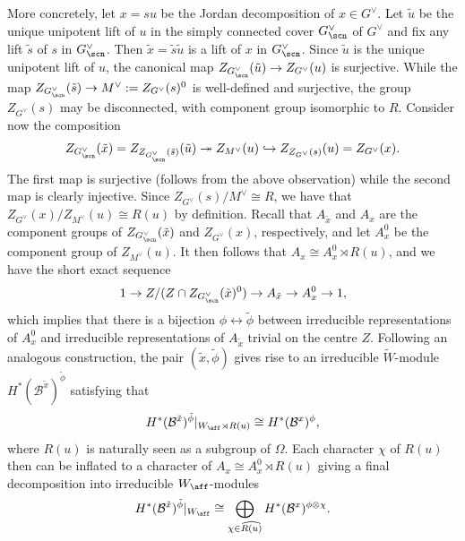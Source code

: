 More concretely, let $x=su$ be the Jordan decomposition of $x\in G^\vee$. Let $\tilde{u}$ be the unique unipotent lift of $u$ in the simply connected cover $G_{\scn}^\vee$ of $G^\vee$ and fix any lift $\tilde{s}$ of $s$ in $G_{\scn}^\vee$. Then $\tilde{x}=\tilde{s}\tilde{u}$ is a lift of $x$ in $G_{\scn}^\vee$. Since $\tilde{u}$ is the unique unipotent lift of $u$, the canonical map $Z_{G_{\scn}^\vee}(\tilde{u})\rightarrow Z_{G^\vee}(u)$ is surjective. While the map $Z_{G_{\scn}^\vee}(\tilde{s})\rightarrow M^\vee:=Z_{G^\vee}(s)^0$ is well-defined and surjective, the group $Z_{G^\vee}(s)$ may be disconnected, with component group isomorphic to $R$. Consider now the composition
$$Z_{G_{\scn}^\vee}(\tilde{x})=Z_{Z_{G_{\scn}^\vee}(\tilde{s})}(\tilde{u})\twoheadrightarrow Z_{M^\vee}(u)\hookrightarrow Z_{Z_{G^\vee}(s)}(u)=Z_{G^\vee}(x).$$
The first map is surjective (follows from the above observation) while the second map is clearly injective.
Since $Z_{G^\vee}(s)/M^\vee\cong R$, we have that $Z_{G^\vee}(x)/Z_{M^\vee}(u)\cong R(u)$ by definition. Recall that $A_{\tilde{x}}$ and $A_x$ are the component groups of $Z_{G_{\scn}^\vee}(\tilde{x})$ and $Z_{G^\vee}(x)$, respectively, and let $A_x^0$ be the component group of $Z_{M^\vee}(u)$. It then follows that $A_x\cong A_x^0\rtimes R(u)$, and we have the short exact sequence 
\begin{equation}
    1\rightarrow Z/(Z\cap Z_{G_{\scn}^\vee}(\tilde{x})^0)\rightarrow A_{\tilde{x}}\rightarrow A_x^0\rightarrow 1,
\end{equation}
which implies that there is a bijection $\phi\leftrightarrow\tilde{\phi}$ between irreducible representations of $A_x^0$ and irreducible representations of $A_{\tilde{x}}$ trivial on the centre $Z$. Following an analogous construction, the pair $(\tilde{x},\tilde{\phi})$ gives rise to an irreducible $\widetilde{W}$-module $H^*(\mathcal{B}^{\tilde{x}})^{\tilde{\phi}}$ satisfying that 
$$H^*(\mathcal{B}^{\tilde{x}})^{\tilde{\phi}}|_{W_{\aff}\rtimes R(u)}\cong H^*(\mathcal{B}^x)^\phi,$$
where $R(u)$ is naturally seen as a subgroup of $\Omega$.
Each character $\chi$ of $R(u)$ then can be inflated to a character of $A_x\cong A_x^0\rtimes R(u)$ giving a final decomposition into irreducible $W_{\aff}$-modules
$$H^*(\mathcal{B}^{\tilde{x}})^{\tilde{\phi}}|_{W_{\aff}}\cong\bigoplus_{\chi\in\widehat{R(u)}} H^*(\mathcal{B}^x)^{\phi\otimes\chi}.$$


